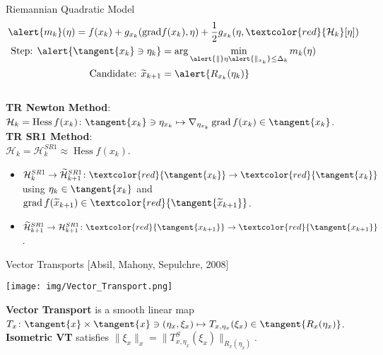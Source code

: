 \documentclass{beamer}
\begin{document}
\begin{frame}{Riemannian Quadratic Model}
    \begin{align*}
        \alert{m_k}(\eta) = f(x_k) + g_{x_k}(\operatorname{grad} & f(x_k), \eta) + \frac{1}{2} g_{x_k}(\eta, \textcolor{red}{\mathcal{H}_k} [\eta]) \\
        \text{Step: } \alert{\tangent{x_k} \ni \eta_k} & = \arg \min_{\alert{\lVert} \eta \alert{\rVert_{x_k}} \leq \Delta_k} m_k(\eta) \\
        \text{Candidate: } \widetilde{x}_{k+1} & = \alert{R_{x_k}(\eta_k)}
    \end{align*} \\[0.5\baselineskip]
    \textbf{TR Newton Method}: \\
    $\mathcal{H}_k = \operatorname{Hess} f(x_k) \colon \tangent{x_k} \ni \eta_{x_k} \mapsto \nabla_{\eta_{x_k}} \operatorname{grad} f(x_k) \in \tangent{x_k}$. \\[0.5\baselineskip]
	\textbf{TR SR1 Method}: \\
    $\mathcal{H}_k = \mathcal{H}^{SR1}_k \approx \operatorname{Hess} f(x_k)$. \\[-0.1\baselineskip]
    \begin{itemize}
        \item $\mathcal{H}^{SR1}_k \rightarrow \widetilde{\mathcal{H}}^{SR1}_{k+1} \colon \textcolor{red}{\tangent{x_k}} \to \textcolor{red}{\tangent{x_k}}$ using $\eta_k \in \tangent{x_k}$ and $\operatorname{grad}f(\widetilde{x}_{k+1}) \in \textcolor{red}{\tangent{\widetilde{x}_{k+1}}}$.
        \item $\widetilde{\mathcal{H}}^{SR1}_{k+1} \rightarrow \mathcal{H}^{SR1}_{k+1} \colon \textcolor{red}{\tangent{x_{k+1}}} \to \textcolor{red}{\tangent{x_{k+1}}}$.
    \end{itemize}
\end{frame}

\begin{frame}{Vector Transports}
    \vspace{-1\baselineskip}\hfill{\tiny{[Absil, Mahony, Sepulchre, 2008]}}
    \begin{center}
        \texttt{[image: img/Vector\_Transport.png]}
    \end{center}
    \textbf{Vector Transport} is a smooth linear map $T_x \colon \tangent{x} \times \tangent{x} \ni (\eta_x, \xi_x) \mapsto T_{x, \eta_x}(\xi_x) \in \tangent{R_x(\eta_x)}$. \\[0.5\baselineskip]
    \textbf{Isometric VT} satisfies $\lVert \xi_x \rVert_x = \lVert T^{S}_{x, \eta_x}(\xi_x) \rVert_{R_x(\eta_x)}$.
\end{frame}
\end{document}
